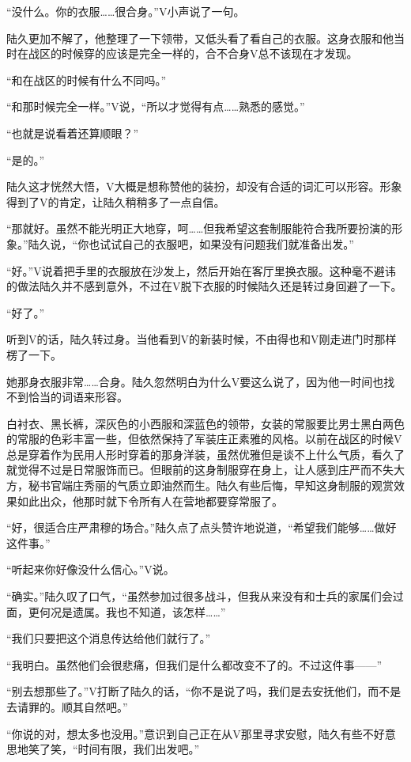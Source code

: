 “没什么。你的衣服……很合身。”V小声说了一句。

陆久更加不解了，他整理了一下领带，又低头看了看自己的衣服。这身衣服和他当时在战区的时候穿的应该是完全一样的，合不合身V总不该现在才发现。

“和在战区的时候有什么不同吗。”

“和那时候完全一样。”V说，“所以才觉得有点……熟悉的感觉。”

“也就是说看着还算顺眼？”

“是的。”

陆久这才恍然大悟，V大概是想称赞他的装扮，却没有合适的词汇可以形容。形象得到了V的肯定，让陆久稍稍多了一点自信。

“那就好。虽然不能光明正大地穿，呵……但我希望这套制服能符合我所要扮演的形象。”陆久说，“你也试试自己的衣服吧，如果没有问题我们就准备出发。”

“好。”V说着把手里的衣服放在沙发上，然后开始在客厅里换衣服。这种毫不避讳的做法陆久并不感到意外，不过在V脱下衣服的时候陆久还是转过身回避了一下。

“好了。”

听到V的话，陆久转过身。当他看到V的新装时候，不由得也和V刚走进门时那样楞了一下。

她那身衣服非常……合身。陆久忽然明白为什么V要这么说了，因为他一时间也找不到恰当的词语来形容。

白衬衣、黑长裤，深灰色的小西服和深蓝色的领带，女装的常服要比男士黑白两色的常服的色彩丰富一些，但依然保持了军装庄正素雅的风格。以前在战区的时候V总是穿着作为民用人形时穿着的那身洋装，虽然优雅但是谈不上什么气质，看久了就觉得不过是日常服饰而已。但眼前的这身制服穿在身上，让人感到庄严而不失大方，秘书官端庄秀丽的气质立即油然而生。陆久有些后悔，早知这身制服的观赏效果如此出众，他那时就下令所有人在营地都要穿常服了。

“好，很适合庄严肃穆的场合。”陆久点了点头赞许地说道，“希望我们能够……做好这件事。”

“听起来你好像没什么信心。”V说。

“确实。”陆久叹了口气，“虽然参加过很多战斗，但我从来没有和士兵的家属们会过面，更何况是遗属。我也不知道，该怎样……”

“我们只要把这个消息传达给他们就行了。”

“我明白。虽然他们会很悲痛，但我们是什么都改变不了的。不过这件事——”

“别去想那些了。”V打断了陆久的话，“你不是说了吗，我们是去安抚他们，而不是去请罪的。顺其自然吧。”

“你说的对，想太多也没用。”意识到自己正在从V那里寻求安慰，陆久有些不好意思地笑了笑，“时间有限，我们出发吧。”

